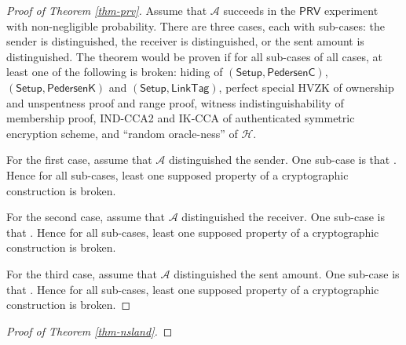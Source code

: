 \documentclass{article}
\begin{document}
\begin{proof}[Proof of Theorem \ref{thm-prv}]
Assume that $\mathcal{A}$ succeeds in the $\textsf{PRV}$ experiment with non-negligible probability. There are three cases, each with sub-cases: the sender is distinguished, the receiver is distinguished, or the sent amount is distinguished. The theorem would be proven if for all sub-cases of all cases, at least one of the following is broken: hiding of $(\textsf{Setup},\textsf{PedersenC})$, $(\textsf{Setup},\textsf{PedersenK})$ and $(\textsf{Setup},\textsf{LinkTag})$, perfect special HVZK of ownership and unspentness proof and range proof, witness indistinguishability of membership proof, IND-CCA2 and IK-CCA of authenticated symmetric encryption scheme, and ``random oracle-ness'' of $\mathcal{H}$.

For the first case, assume that $\mathcal{A}$ distinguished the sender. One sub-case is that . Hence for all sub-cases, least one supposed property of a cryptographic construction is broken.

For the second case, assume that $\mathcal{A}$ distinguished the receiver. One sub-case is that . Hence for all sub-cases, least one supposed property of a cryptographic construction is broken.

For the third case, assume that $\mathcal{A}$ distinguished the sent amount. One sub-case is that . Hence for all sub-cases, least one supposed property of a cryptographic construction is broken.
\end{proof}
\begin{proof}[Proof of Theorem \ref{thm-nsland}]
\end{proof}
\end{document}
